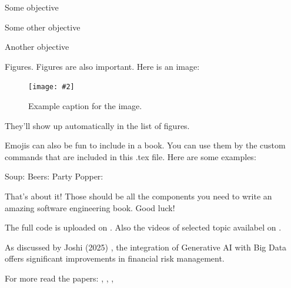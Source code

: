 \documentclass[a4paper,headinclude=on,footinclude=on,12pt,oneside]{scrbook}
\newcommand{\standardfigure}[3]{\begin{figure}[H]\begin{center}\texttt{[image: \#2]}\caption{#3}\label{fig:#2}\end{center}\end{figure}}
\begin{document}
\begin{arrows}
\item Some objective
\item Some other objective
\item Another objective
\end{arrows}



Figures. Figures are also important. Here is an image:

\standardfigure{\textwidth/2}{folder-one/example}{Example caption for the image.}

They'll show up automatically in the list of figures.


Emojis can also be fun to include in a book. You can use them by the custom commands that are included in this .tex file. Here are some examples:

Soup: \soup
Beers: \beers
Party Popper: \partypopper

That's about it! Those should be all the components you need to write an amazing software engineering book. Good luck!

The full code is uploaded on \cite{JoshiGit2025}.
Also the videos of selected topic availabel on \cite{JoshiYouTube2025}.
 
As discussed by Joshi (2025) \cite{JoshiIJFMR2025}, the integration of Generative AI with Big Data offers significant improvements in financial risk management.

For more read the papers: \cite{JoshiCSEIT2025}, \cite{JoshiIJFMR2025}, \cite{JoshiIJFMR2025}, \cite{JoshiIJIREM2025}
\end{document}
